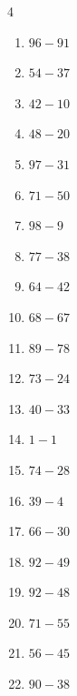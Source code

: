 \begin{multicols}{4}
\begin{enumerate}
  \item $96-91$
        \phantom{$=5$}

  \item $54-37$
        \phantom{$=17$}

  \item $42-10$
        \phantom{$=32$}

  \item $48-20$
        \phantom{$=28$}

  \item $97-31$
        \phantom{$=66$}

  \item $71-50$
        \phantom{$=21$}

  \item $98-9$
        \phantom{$=89$}

  \item $77-38$
        \phantom{$=39$}

  \item $64-42$
        \phantom{$=22$}

  \item $68-67$
        \phantom{$=1$}

  \item $89-78$
        \phantom{$=11$}

  \item $73-24$
        \phantom{$=49$}

  \item $40-33$
        \phantom{$=7$}

  \item $1-1$
        \phantom{$=0$}

  \item $74-28$
        \phantom{$=46$}

  \item $39-4$
        \phantom{$=35$}

  \item $66-30$
        \phantom{$=36$}

  \item $92-49$
        \phantom{$=43$}

  \item $92-48$
        \phantom{$=44$}

  \item $71-55$
        \phantom{$=16$}

  \item $56-45$
        \phantom{$=11$}

  \item $90-38$
        \phantom{$=52$}


\end{enumerate}
\end{multicols}
